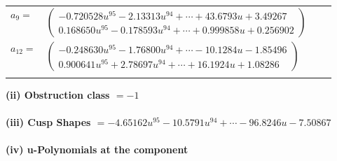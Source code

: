 \documentclass[1p]{elsarticle_modified}
\theoremstyle{definition}
\begin{document}
\begin{tabular}{m{7pt} m{180pt} m{7pt} m{180pt} }
\flushright $a_{9}=$&$\begin{pmatrix}-0.720528 u^{95}-2.13313 u^{94}+\cdots+43.6793 u+3.49267\\0.168650 u^{95}-0.178593 u^{94}+\cdots+0.999858 u+0.256902\end{pmatrix}$ \\
\flushright $a_{12}=$&$\begin{pmatrix}-0.248630 u^{95}-1.76800 u^{94}+\cdots-10.1284 u-1.85496\\0.900641 u^{95}+2.78697 u^{94}+\cdots+16.1924 u+1.08286\end{pmatrix}$\\&\end{tabular}
\flushleft \textbf{(ii) Obstruction class $= -1$}\\~\\
\flushleft \textbf{(iii) Cusp Shapes $= -4.65162 u^{95}-10.5791 u^{94}+\cdots-96.8246 u-7.50867$}\\~\\
\newpage\renewcommand{\arraystretch}{1}
\flushleft \textbf{(iv) u-Polynomials at the component}\newline \\
\end{document}
